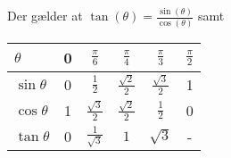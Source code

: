 Der gælder at $ \tan(\theta)=\frac{\sin(\theta)}{\cos(\theta)}$ samt
\begin{center}
\begin{tabular}{@{} lccccc @{}}
	\toprule 
	$\theta$			& 0			&$ \frac{\pi}{6} $  		&$ \frac{\pi}{4} $ 		&$ \frac{\pi}{3}$ 			&$ \frac{\pi}{2} $		\\ \midrule
	$\sin \theta$		&0			&$ \frac{1}{2} $			&$ \frac{\sqrt{2}}{2} $	& $ \frac{\sqrt{3}}{2} $ 	& 1						\\ \midrule
	$\cos \theta$		&1			&$\frac{\sqrt{3}}{2}$		&$\frac{\sqrt{2}}{2}$	& $\frac{1}{2}$				&0	\\ \midrule
	$\tan \theta$		&0			&$\frac{1}{\sqrt{3}}$		&$1$					& $ \sqrt{3} $				&-		\\ \midrule
\end{tabular}
\end{center}






















